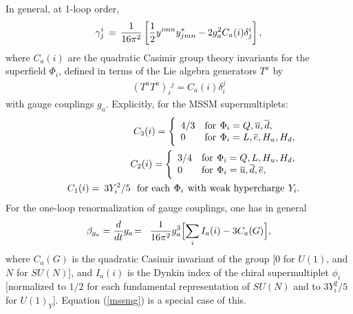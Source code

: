 \documentclass[12pt]{article}
\def\beq{\begin{eqnarray}}
\def\eeq{\end{eqnarray}}
\def\sbar{\overline}
\def\half{{1\over 2}}
\begin{document}
In general, at 1-loop order, 
\beq
\gamma^i_j \,=\, \frac{1}{16 \pi^2} \left [
\half y^{imn} y^*_{jmn} - 2 g_a^2 C_a(i) 
\delta_j^i
\right ],
\label{eq:gengamma}
\eeq
where $C_a(i)$ are the quadratic Casimir group theory invariants for the
superfield $\Phi_i$, defined in terms of the Lie algebra generators $T^a$
by 
\beq
(T^aT^a)_i{}^{j}= C_a(i) \delta_i^j 
\label{eq:defCasimir}
\eeq 
with gauge couplings $g_a$. 
Explicitly, for the MSSM supermultiplets: 
\beq
&&
C_3(i) =
\Biggl \{ \begin{array}{ll}
4/3 & {\rm for}\>\,\Phi_i = Q, \sbar u, \sbar d,
\\
0 & {\rm for}\>\,\Phi_i = L, \sbar e, H_u, H_d,
\end{array}
\label{defC3}
\\
&&
C_2(i) =
\Biggl \{ \begin{array}{ll}
3/4 & {\rm for}\>\,\Phi_i = Q, L, H_u, H_d,\\
0 & {\rm for}\>\,\Phi_i = \sbar u, \sbar d, \sbar e
,\end{array}
\\
&&
C_1(i) = \>
3 Y_i^2/5 \>\>\>{\rm for~each}\>\,\Phi_i\>\,{\rm
with~weak~hypercharge}\>\, Y_i.
\label{defC1}
\eeq
For the one-loop renormalization of gauge couplings, one has in
general
\beq
\beta_{g_a} = 
{d\over dt} g_a 
\!&=&\! 
{1\over 16\pi^2} g_a^3 \Bigl [\sum_i I_a(i) - 3 C_a(G) \Bigr ],
\eeq
where $C_a(G)$ is the quadratic Casimir invariant of the
group [0 for $U(1)$, and $N$ for $SU(N)$], and
$I_a(i)$ is the Dynkin index of the chiral supermultiplet $\phi_i$
[normalized to $1/2$ for each fundamental representation of $SU(N)$ and
to $3 Y_i^2/5$ for $U(1)_Y$]. Equation (\ref{mssmg})
is a special case of this.
\end{document}
